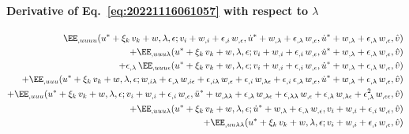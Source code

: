 \paragraph{Derivative of Eq.~\eqref{eq:20221116061057} with respect to \(\lambda\)}
\begin{equation}
  \begin{aligned}[b]
    \EE_{,uuuu}(u^\ast + \xi_k \, v_k + w, \lambda, \epsilon; v_i + w_{,i} + \epsilon_{,i} \, w_{,\epsilon}, \dot{u}^\ast + w_{,\lambda} + \epsilon_{,\lambda} \, w_{,\epsilon}, \dot{u}^\ast + w_{,\lambda} + \epsilon_{,\lambda} \, w_{,\epsilon}, \hat{v}) &\\
    + \EE_{,uuu\lambda}(u^\ast + \xi_k \, v_k + w, \lambda, \epsilon; v_i + w_{,i} + \epsilon_{,i} \, w_{,\epsilon}, \dot{u}^\ast + w_{,\lambda} + \epsilon_{,\lambda} \, w_{,\epsilon}, \hat{v}) &\\
    + \epsilon_{,\lambda} \, \EE_{,uuu\epsilon}(u^\ast + \xi_k \, v_k + w, \lambda, \epsilon; v_i + w_{,i} + \epsilon_{,i} \, w_{,\epsilon}, \dot{u}^\ast + w_{,\lambda} + \epsilon_{,\lambda} \, w_{,\epsilon}, \hat{v}) &\\
    + \EE_{,uuu}(u^\ast + \xi_k \, v_k + w, \lambda, \epsilon; w_{,i\lambda} + \epsilon_{,\lambda} \, w_{,i\epsilon} + \epsilon_{,i\lambda} \, w_{,\epsilon} + \epsilon_{,i} \, w_{,\lambda\epsilon} + \epsilon_{,i} \, \epsilon_{,\lambda} \, w_{,\epsilon}, \dot{u}^\ast + w_{,\lambda} + \epsilon_{,\lambda} \, w_{,\epsilon}, \hat{v}) &\\
    + \EE_{,uuu}(u^\ast + \xi_k \, v_k + w, \lambda, \epsilon; v_i + w_{,i} + \epsilon_{,i} \, w_{,\epsilon}, \ddot{u}^\ast + w_{,\lambda\lambda} + \epsilon_{,\lambda} \, w_{,\lambda\epsilon} + \epsilon_{,\lambda\lambda} \, w_{, \epsilon} + \epsilon_{,\lambda} \, w_{,\lambda\epsilon} + \epsilon_{,\lambda}^2 \, w_{,\epsilon\epsilon}, \hat{v}) &\\
    + \EE_{,uuu\lambda}(u^\ast + \xi_k \, v_k + w, \lambda, \epsilon; \dot{u}^\ast + w_{,\lambda} + \epsilon_{,\lambda} \, w_{,\epsilon}, v_i + w_{,i} + \epsilon_{,i} \, w_{,\epsilon}, \hat{v}) &\\
    + \EE_{,uu\lambda\lambda}(u^\ast + \xi_k \, v_k + w, \lambda, \epsilon; v_i + w_{,i} + \epsilon_{,i} \, w_{,\epsilon}, \hat{v}) &\\

\end{aligned}
\end{equation}
